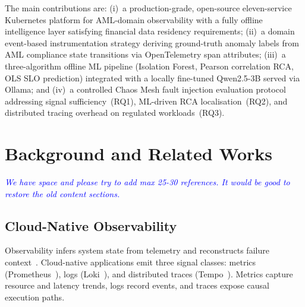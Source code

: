 \documentclass[a4paper]{lipics-v2021}
\begin{document}
The main contributions are: (i)~a production-grade, open-source eleven-service
Kubernetes platform for AML-domain observability with a fully offline intelligence
layer satisfying financial data residency requirements; (ii)~a domain event-based
instrumentation strategy deriving ground-truth anomaly labels from AML compliance
state transitions via OpenTelemetry span attributes; (iii)~a three-algorithm offline
ML pipeline (Isolation Forest, Pearson correlation RCA, OLS SLO prediction)
integrated with a locally fine-tuned Qwen2.5-3B served via Ollama; and (iv)~a
controlled Chaos Mesh fault injection evaluation protocol addressing signal
sufficiency~(RQ1), ML-driven RCA localisation~(RQ2), and distributed tracing
overhead on regulated workloads~(RQ3).

\section{Background and Related Works}
\label{sec:background}
\textit{\textcolor{blue}{We have space and please try to add max 25-30 references. It would be good to restore the old content sections.  }}
\subsection{Cloud-Native Observability}

Observability infers system state from telemetry and reconstructs failure
context~\cite{boten2022cloudnative}. Cloud-native applications emit three signal
classes: metrics (Prometheus~\cite{prometheus2015}), logs (Loki~\cite{loki2019}),
and distributed traces (Tempo~\cite{tempo2022}). Metrics capture resource and
latency trends, logs record events, and traces expose causal execution paths.
\end{document}
